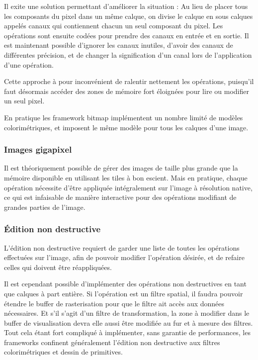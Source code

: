 				Il exite une solution permettant d'améliorer la situation : Au lieu de placer tous les composants du pixel dans un même calque, on
				divise le calque en sous calques appelés canaux qui contiennent chacun un seul composant du pixel. Les opérations sont ensuite 
				codées pour prendre des canaux en entrée et en sortie. Il est maintenant possible d'ignorer les canaux inutiles, d'avoir des canaux
				de différentes précision, et de changer la signification d'un canal lors de l'application d'une opération. 

				Cette approche à pour inconvénient de ralentir nettement les opérations, puisqu'il faut désormais accéder des zones de 
				mémoire fort éloignées pour lire ou modifier un seul pixel. 

				En pratique les framework bitmap implémentent un nombre limité de modèles colorimétriques, et imposent
				le même modèle pour tous les calques d'une image. 
			\subsubsection{Images gigapixel}
				Il est théoriquement possible de gérer des images de taille plus grande que la mémoire disponible en utilisant les tiles à
				bon escient. Mais en pratique, chaque opération nécessite d'être appliquée intégralement sur l'image à résolution native, 
				ce qui est infaisable de manière interactive pour des opérations modifiant de grandes parties de l'image.
			\subsubsection{Édition non destructive}
				L'édition non destructive requiert de garder une liste de toutes les opérations effectuées sur l'image, afin de pouvoir
				modifier l'opération désirée, et de refaire celles qui doivent être réappliquées. 

				Il est cependant possible d'implémenter des opérations non destructives en tant que calques à part entière. 
				Si l'opération est un filtre spatial, il faudra pouvoir étendre le buffer de rasterisation pour que le filtre ait accès aux données
				nécessaires. Et s'il s'agit d'un filtre de transformation, la zone à modifier dans le buffer de visualisation devra elle aussi
				être modifiée au fur et à mesure des filtres. Tout cela étant fort compliqué à implémenter, sans garantie de performances, 
				les frameworks confinent généralement l'édition non destructive aux filtres colorimétriques et dessin de primitives.
